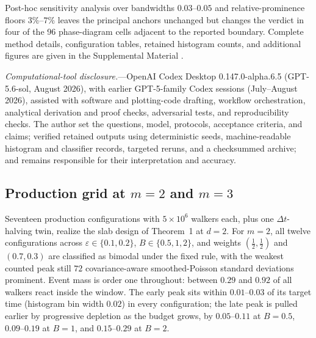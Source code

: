 \documentclass[aps,physrev,reprint,amsmath,amssymb,longbibliography,floatfix]{revtex4-2}
\begin{document}
Post-hoc sensitivity analysis over bandwidths
\(0.03\)--\(0.05\) and relative-prominence floors \(3\%\)--\(7\%\) leaves
the principal anchors unchanged but changes the verdict in four of the 96
phase-diagram cells adjacent to the reported boundary.  Complete method
details, configuration tables, retained histogram counts, and additional
figures are given in the Supplemental Material \cite{supplementalMaterial}.

\noindent\textit{Computational-tool disclosure.}---OpenAI Codex Desktop 0.147.0-alpha.6.5 (GPT-5.6-sol, August 2026), with
earlier GPT-5-family Codex sessions (July--August 2026), assisted with
software and plotting-code drafting, workflow orchestration, analytical
derivation and proof checks, adversarial tests, and reproducibility checks.
The author set the questions, model, protocols, acceptance criteria, and
claims; verified retained outputs using deterministic seeds, machine-readable
histogram and classifier records, targeted reruns, and a checksummed archive;
and remains responsible for their interpretation and accuracy.

\subsection{Production grid at \texorpdfstring{$m=2$ and $m=3$}{m=2 and m=3}}
\label{sec:numerics-production}

Seventeen production configurations with \(5\times10^{6}\) walkers each,
plus one \(\Delta t\)-halving twin, realize the slab design of Theorem~1 at \(d=2\).  For \(m=2\), all twelve
configurations across
\(\varepsilon\in\{0.1,0.2\}\), \(B\in\{0.5,1,2\}\), and weights
\((\tfrac12,\tfrac12)\) and \((0.7,0.3)\) are classified as bimodal under
the fixed rule,
with the weakest counted peak still \(72\) covariance-aware smoothed-Poisson
standard deviations prominent.  Event mass is order one throughout: between \(0.29\) and
\(0.92\) of all walkers react inside the window.  The early peak sits within
\(0.01\)--\(0.03\) of its target time (histogram bin width \(0.02\)) in every configuration; the late peak
is pulled earlier by progressive depletion as the budget grows, by
\(0.05\)--\(0.11\) at \(B=0.5\), \(0.09\)--\(0.19\) at \(B=1\), and
\(0.15\)--\(0.29\) at \(B=2\).
\end{document}
